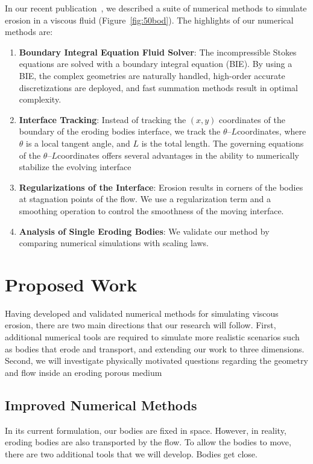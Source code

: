 \documentclass[11pt]{article}
\newcommand{\thL}{$\theta$--$L$}
\begin{document}
In our recent publication~\cite{qua-moo2018}, we described a suite of
numerical methods to simulate erosion in a viscous fluid
(Figure~\ref{fig:50bod}).  The highlights of our numerical methods are:
\begin{enumerate}[topsep=0pt,itemsep=-1ex,partopsep=1ex,parsep=1ex]
  \item {\bf Boundary Integral Equation Fluid Solver}: The
  incompressible Stokes equations are solved with a boundary integral
  equation (BIE).  By using a BIE, the complex geometries are naturally
  handled, high-order accurate discretizations are deployed, and fast
  summation methods result in optimal complexity.

  \item {\bf Interface Tracking}: Instead of tracking the $(x,y)$
  coordinates of the boundary of the eroding bodies interface, we track
  the \thL coordinates, where $\theta$ is a local tangent angle, and $L$
  is the total length.  The governing equations of the \thL coordinates
  offers several advantages in the ability to numerically stabilize the
  evolving interface

  \item {\bf Regularizations of the Interface}: Erosion results in
  corners of the bodies at stagnation points of the flow.  We 
  use a regularization term and a smoothing operation to control the
  smoothness of the moving interface.

  \item {\bf Analysis of Single Eroding Bodies}: We validate our method
  by comparing numerical simulations with scaling laws.
\end{enumerate}

\section{Proposed Work}
Having developed and validated numerical methods for simulating viscous
erosion, there are two main directions that our research will follow.
First, additional numerical tools are required to simulate more
realistic scenarios such as bodies that erode and transport, and
extending our work to three dimensions.  Second, we will investigate
physically motivated questions regarding the geometry and flow inside an
eroding porous medium

\subsection{Improved Numerical Methods}
In its current formulation, our bodies are fixed in space.  However, in
reality, eroding bodies are also transported by the flow.  To allow the
bodies to move, there are two additional tools that we will develop.
Bodies get close.
\end{document}
